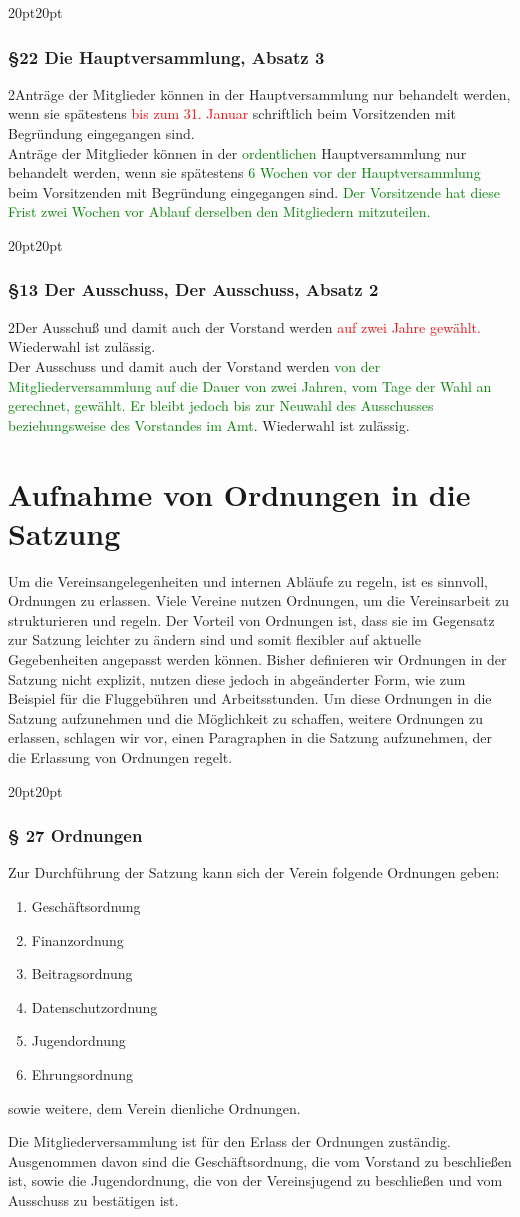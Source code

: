 \documentclass[10pt,a4paper,parskip=half]{scrartcl}
\newcommand{\new}[1]{\textcolor{Green}{#1}}
\newcommand{\old}[1]{\textcolor{Red}{#1}}
\newcommand{\change}[1]{
  \begin{adjustwidth}{20pt}{20pt}
    #1
  \end{adjustwidth}
}
\newcommand{\compare}[3]{\change{\subsubsection*{#1}\begin{multicols}{2}#2\columnbreak\\#3\end{multicols}}}
\begin{document}
\compare{§22 Die Hauptversammlung, Absatz 3}{Anträge der Mitglieder können in der Haupt\-ver\-samm\-lung nur behandelt werden,
  wenn sie spätestens \old{bis zum 31. Januar} schriftlich beim Vorsitzenden mit Begründung eingegangen sind.}
{Anträge der Mitglieder können in der \new{ordentlichen} Haupt\-ver\-samm\-lung nur behandelt werden,
  wenn sie spätestens \new{6 Wochen vor der Hauptversammlung} beim Vorsitzenden mit Begründung eingegangen sind.
  \new{Der Vorsitzende hat diese Frist zwei Wochen vor Ablauf derselben den Mitgliedern mitzuteilen.}
}

\compare{§13 Der Ausschuss, Der Ausschuss, Absatz 2}
{Der Ausschuß und damit auch der Vorstand werden \old{auf zwei Jahre gewählt.}
  Wiederwahl ist zulässig.}
{Der Ausschuss und damit auch der Vorstand werden \new{von der Mitgliederversammlung auf die Dauer von zwei Jahren, vom Tage der Wahl an gerechnet, gewählt.
    Er bleibt jedoch bis zur Neuwahl des Ausschusses beziehungsweise des Vorstandes im Amt}.  Wiederwahl ist zulässig.}

\clearpage
\section{Aufnahme von Ordnungen in die Satzung}
\label{sec:ordnungen}
Um die Vereinsangelegenheiten und internen Abläufe zu regeln, ist es sinnvoll, Ordnungen zu erlassen. Viele Vereine nutzen Ordnungen, um die Vereinsarbeit zu strukturieren und regeln. Der Vorteil von Ordnungen ist, dass sie im Gegensatz zur Satzung leichter zu ändern sind und somit flexibler auf aktuelle Gegebenheiten angepasst werden können. Bisher definieren wir Ordnungen in der Satzung nicht explizit, nutzen diese jedoch in abgeänderter Form, wie zum Beispiel für die Fluggebühren und Arbeitsstunden. Um diese Ordnungen in die Satzung aufzunehmen und die Möglichkeit zu schaffen, weitere Ordnungen zu erlassen, schlagen wir vor, einen Paragraphen in die Satzung aufzunehmen, der die Erlassung von Ordnungen regelt.

\change{
  \subsubsection*{§ 27 Ordnungen}
  Zur Durchführung der Satzung kann sich der Verein folgende Ordnungen geben:
  \begin{enumerate}[label=\alph*),noitemsep]
    \item Geschäftsordnung
    \item Finanzordnung
    \item Beitragsordnung
    \item Datenschutzordnung
    \item Jugendordnung
    \item Ehrungsordnung
  \end{enumerate}
  sowie weitere, dem Verein dienliche Ordnungen.

  Die Mitgliederversammlung ist für den Erlass der Ordnungen zuständig.
  Ausgenommen davon sind die Geschäftsordnung,
  die vom Vorstand zu beschließen ist,
  sowie die Jugendordnung,
  die von der Vereinsjugend zu beschließen und vom Ausschuss zu bestätigen ist.
}
\end{document}
